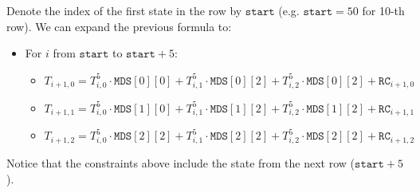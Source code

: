 Denote the index of the first state in the row by $\texttt{start}$ (e.g. $\texttt{start}=50$ for 10-th row). 
We can expand the previous formula to:
\begin{itemize}
	\item For $i$ from $\texttt{start}$ to $\texttt{start} + 5$:
	\begin{itemize}
		\item $T_{i + 1, 0} = T_{i, 0}^5 \cdot \texttt{MDS}[0][0] + T_{i, 1}^5 \cdot
				 \texttt{MDS}[0][2] + T_{i, 2}^5 \cdot \texttt{MDS}[0][2] + \texttt{RC}_{i + 1, 0}$
		\item $T_{i + 1, 1} = T_{i, 0}^5 \cdot \texttt{MDS}[1][0] + T_{i, 1}^5 \cdot
				 \texttt{MDS}[1][2] + T_{i, 2}^5 \cdot \texttt{MDS}[1][2] + \texttt{RC}_{i + 1, 1}$
		\item $T_{i + 1, 2} = T_{i, 0}^5 \cdot \texttt{MDS}[2][2] + T_{i, 1}^5 \cdot
				 \texttt{MDS}[2][2] + T_{i, 2}^5 \cdot \texttt{MDS}[2][2] + \texttt{RC}_{i + 1, 2}$
	\end{itemize}
\end{itemize}

Notice that the constraints above include the state from the next row ($\texttt{start} + 5$).